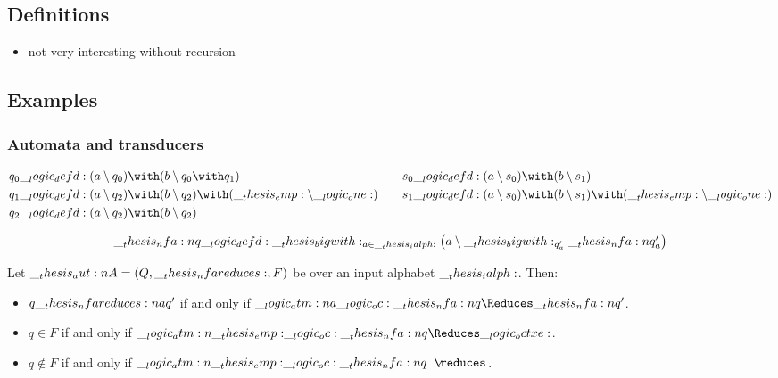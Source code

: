 \subsection{Definitions}

\begin{itemize}
\item not very interesting without recursion
\end{itemize}

\subsection{Examples}

\subsubsection{Automata and transducers}

\begin{equation*}
  \begin{lgathered}[t]
    q_0 \defd (a \limp q_0) \with (b \limp q_0 \with q_1) \\
    q_1 \defd (a \limp q_2) \with (b \limp q_2) \with (\emp \limp \one) \\
    q_2 \defd (a \limp q_2) \with (b \limp q_2)
  \end{lgathered}
  \qquad
  \begin{lgathered}[t]
    s_0 \defd (a \limp s_0) \with (b \limp s_1) \\
    s_1 \defd (a \limp s_0) \with (b \limp s_1) \with (\emp \limp \one)
  \end{lgathered}
\end{equation*}

\begin{equation*}
  \__thesis_nfa:n {q} \__logic_defd: \__thesis_bigwith:_{a \in \__thesis_ialph:} \bigl({\textstyle a \mathbin { \setminus } \__thesis_bigwith:_{q'_a} \__thesis_nfa:n {q}'_a}\bigr)
\end{equation*}

\begin{theorem}
  Let $\aut{A} = (Q, \mathord{\nfareduces}, F)$ be  over an input alphabet $\__thesis_ialph:$.
  Then:
  \begin{itemize}[nosep]
  \item $q \nfareduces[a] q'$ if and only if $\atm{a} \oc \nfa{q} \Reduces \nfa{q}'$.
  \item $q \in F$ if and only if $\atm{\emp} \oc \nfa{q} \Reduces \octxe$.
  \item $q \notin F$ if and only if $\atm{\emp} \oc \nfa{q} \longarrownot\reduces$.
  \end{itemize}
\end{theorem}


